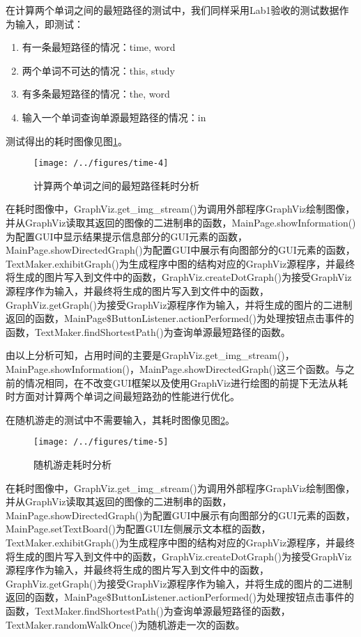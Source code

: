 在计算两个单词之间的最短路径的测试中，我们同样采用Lab1验收的测试数据作为输入，即测试：
\begin{enumerate}
\item 有一条最短路径的情况：time, word
\item 两个单词不可达的情况：this, study
\item 有多条最短路径的情况：the, word
\item 输入一个单词查询单源最短路径的情况：in
\end{enumerate}
测试得出的耗时图像见图\ref{fig:time-4}。

\begin{figure}
\centering
\texttt{[image: /../figures/time-4]}
\caption{计算两个单词之间的最短路径耗时分析}
\label{fig:time-4}
\end{figure}

在耗时图像中，GraphViz.get\_img\_stream()为调用外部程序GraphViz绘制图像，并从GraphViz读取其返回的图像的二进制串的函数，MainPage.showInformation()为配置GUI中显示结果提示信息部分的GUI元素的函数，MainPage.showDirectedGraph()为配置GUI中展示有向图部分的GUI元素的函数，TextMaker.exhibitGraph()为生成程序中图的结构对应的GraphViz源程序，并最终将生成的图片写入到文件中的函数，GraphViz.createDotGraph()为接受GraphViz源程序作为输入，并最终将生成的图片写入到文件中的函数，GraphViz.getGraph()为接受GraphViz源程序作为输入，并将生成的图片的二进制返回的函数，MainPage\$ButtonListener.actionPerformed()为处理按钮点击事件的函数，TextMaker.findShortestPath()为查询单源最短路径的函数。

由以上分析可知，占用时间的主要是GraphViz.get\_img\_stream()，MainPage.showInformation()，MainPage.showDirectedGraph()这三个函数。与之前的情况相同，在不改变GUI框架以及使用GraphViz进行绘图的前提下无法从耗时方面对计算两个单词之间最短路劲的性能进行优化。

在随机游走的测试中不需要输入，其耗时图像见图\ref{fig:time-5}。

\begin{figure}
\centering
\texttt{[image: /../figures/time-5]}
\caption{随机游走耗时分析}
\label{fig:time-5}
\end{figure}

在耗时图像中，GraphViz.get\_img\_stream()为调用外部程序GraphViz绘制图像，并从GraphViz读取其返回的图像的二进制串的函数，MainPage.showDirectedGraph()为配置GUI中展示有向图部分的GUI元素的函数，MainPage.setTextBoard()为配置GUI左侧展示文本框的函数，TextMaker.exhibitGraph()为生成程序中图的结构对应的GraphViz源程序，并最终将生成的图片写入到文件中的函数，GraphViz.createDotGraph()为接受GraphViz源程序作为输入，并最终将生成的图片写入到文件中的函数，GraphViz.getGraph()为接受GraphViz源程序作为输入，并将生成的图片的二进制返回的函数，MainPage\$ButtonListener.actionPerformed()为处理按钮点击事件的函数，TextMaker.findShortestPath()为查询单源最短路径的函数，TextMaker.randomWalkOnce()为随机游走一次的函数。

